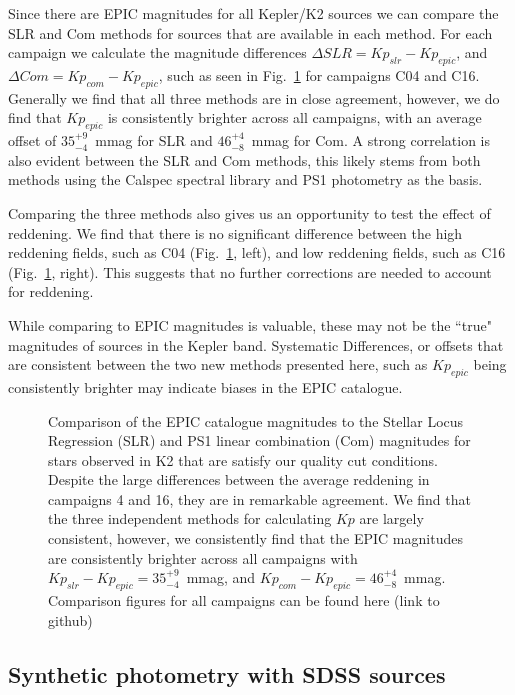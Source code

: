 \documentclass{aastex63}
\begin{document}
Since there are EPIC magnitudes for all Kepler/K2 sources we can compare the SLR and Com methods for sources that are available in each method. For each campaign we calculate the magnitude differences $\Delta SLR=Kp_{slr}-Kp_{epic}$, and $\Delta Com=Kp_{com}-Kp_{epic}$, such as seen in Fig.~\ref{fig:epic_comparison} for campaigns C04 and C16. Generally we find that all three methods are in close agreement, however, we do find that $Kp_{epic}$ is consistently brighter across all campaigns, with an average offset of $35_{-4}^{+9}$~mmag for SLR and $46_{-8}^{+4}$~mmag for Com. A strong correlation is also evident between the SLR and Com methods, this likely stems from both methods using the Calspec spectral library and PS1 photometry as the basis. 

Comparing the three methods also gives us an opportunity to test the effect of reddening. We find that there is no significant difference between the high reddening fields, such as C04 (Fig.~\ref{fig:epic_comparison}, left), and low reddening fields, such as C16 (Fig.~\ref{fig:epic_comparison}, right). This suggests that no further corrections are needed to account for reddening.

While comparing to EPIC magnitudes is valuable, these may not be the ``true" magnitudes of sources in the Kepler band. Systematic Differences, or offsets that are consistent between the two new methods presented here, such as $Kp_{epic}$ being consistently brighter may indicate biases in the EPIC catalogue.


\begin{figure}
\caption{Comparison of the EPIC catalogue magnitudes to the Stellar Locus Regression (SLR) and PS1 linear combination (Com) magnitudes for stars observed in K2 that are satisfy our quality cut conditions. Despite the large differences between the average reddening in campaigns 4 and 16, they are in remarkable agreement. We find that the three independent methods for calculating $Kp$ are largely consistent, however, we consistently find that the EPIC magnitudes are consistently brighter across all campaigns with $Kp_{slr} - Kp_{epic} = 35_{-4}^{+9}$~mmag, and $Kp_{com} - Kp_{epic} = 46_{-8}^{+4}$~mmag. Comparison figures for all campaigns can be found here (link to github) \label{fig:epic_comparison}}
\end{figure}

\subsection{Synthetic photometry with SDSS sources}
\end{document}
